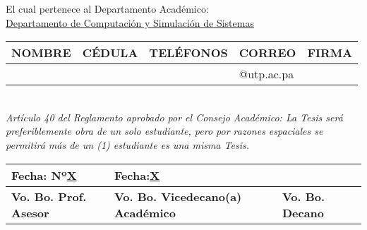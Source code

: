 El cual pertenece al Departamento Académico:\\
\underline{Departamento de Computación y Simulación de Sistemas}

{
\renewcommand{\arraystretch}{1.5}
\begin{tabularx}{\textwidth}{
  | >{\raggedright\arraybackslash}X
  | >{\raggedright\arraybackslash}X
  | >{\raggedright\arraybackslash}X
  | >{\raggedright\arraybackslash}X
  | >{\raggedright\arraybackslash}X |}
  \hline
  \textbf{NOMBRE} & \textbf{CÉDULA} & \textbf{TELÉFONOS} & \textbf{CORREO} & \textbf{FIRMA} \\
  \hline
  & & & @utp.ac.pa & \\
  \hline
\end{tabularx}
}
\\
\itshape \small
Artículo 40 del Reglamento aprobado por el Consejo Académico: La Tesis será preferiblemente obra de un solo estudiante, pero por razones espaciales se permitirá más de un (1) estudiante es una misma Tesis.
\upshape \normalsize

{
\renewcommand{\arraystretch}{1.5}
\begin{tabularx}{\textwidth}{|s|b|t|}
  \hline
  Fecha: Nº\underline{X} & Fecha:\underline{X} & \\
  \hline
  \textbf{Vo. Bo. Prof. Asesor} & \textbf{Vo. Bo. Vicedecano(a) Académico} & \textbf{Vo. Bo. Decano} \\
  \hline
\end{tabularx}
}
